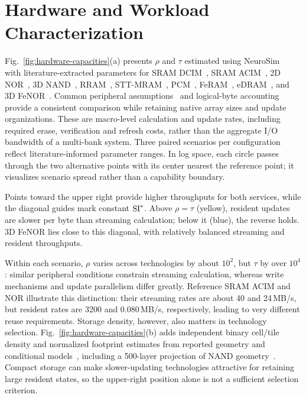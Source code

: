 \paperplacecharacterizationobjects
\section{Hardware and Workload Characterization}
\label{sec:characterization}

Fig.~\ref{fig:hardware-capacities}(a) presents $\rho$ and $\tau$ estimated using NeuroSim~\cite{lee2024neurosim,peng2019dnnneurosim} with literature-extracted parameters for SRAM DCIM~\cite{SDCIM-01,SDCIM-03,SDCIM-05}, SRAM ACIM~\cite{SACIM-03,jia2022imc,SACIM-05}, 2D NOR~\cite{NOR-01,NOR-02,NOR-04}, 3D NAND~\cite{NAND-04,NAND-05,NAND-06}, RRAM~\cite{RRAM-05,RRAM-01,RRAM-06}, STT-MRAM~\cite{MRAM-06,MRAM-03,MRAM-04}, PCM~\cite{PCM-03,PCM-01,PCM-06}, FeRAM~\cite{FERAM-03,FERAM-04,FERAM-02}, eDRAM~\cite{GC-04,GC-02,GC-05}, and 3D FeNOR~\cite{FENOR-02,FENOR-01,FENOR-04}. Common peripheral assumptions~\cite{CMOS-02,CMOS-03,CMOS-07} and logical-byte accounting provide a consistent comparison while retaining native array sizes and update organizations. These are macro-level calculation and update rates, including required erase, verification and refresh costs, rather than the aggregate I/O bandwidth of a multi-bank system. Three paired scenarios per configuration reflect literature-informed parameter ranges. In log space, each circle passes through the two alternative points with its center nearest the reference point; it visualizes scenario spread rather than a capability boundary.

Points toward the upper right provide higher throughputs for both services, while the diagonal guides mark constant $\mathrm{SI}^*$. Above $\rho=\tau$ (yellow), resident updates are slower per byte than streaming calculation; below it (blue), the reverse holds. 3D FeNOR lies close to this diagonal, with relatively balanced streaming and resident throughputs.

Within each scenario, $\rho$ varies across technologies by about $10^2$, but $\tau$ by over $10^4$: similar peripheral conditions constrain streaming calculation, whereas write mechanisms and update parallelism differ greatly. Reference SRAM ACIM and NOR illustrate this distinction: their streaming rates are about 40 and 24\,MB/s, but resident rates are 3200 and 0.080\,MB/s, respectively, leading to very different reuse requirements. Storage density, however, also matters in technology selection. Fig.~\ref{fig:hardware-capacities}(b) adds independent binary cell/tile density and normalized footprint estimates from reported geometry and conditional models~\cite{NOR-GF28-2023,PCM-PALHARES-2024,FERAM-07-JEDS}, including a 500-layer projection of NAND geometry~\cite{NAND-04}. Compact storage can make slower-updating technologies attractive for retaining large resident states, so the upper-right position alone is not a sufficient selection criterion.


